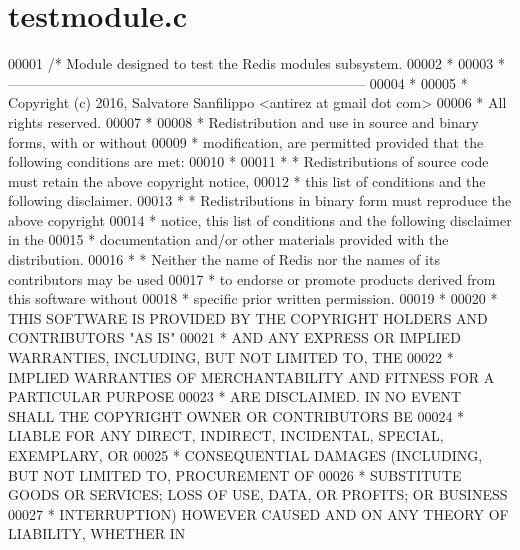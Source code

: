 \hypertarget{testmodule_8c_source}{}\section{testmodule.\+c}
\label{testmodule_8c_source}

\begin{DoxyCode}
00001 \textcolor{comment}{/* Module designed to test the Redis modules subsystem.}
00002 \textcolor{comment}{ *}
00003 \textcolor{comment}{ * -----------------------------------------------------------------------------}
00004 \textcolor{comment}{ *}
00005 \textcolor{comment}{ * Copyright (c) 2016, Salvatore Sanfilippo <antirez at gmail dot com>}
00006 \textcolor{comment}{ * All rights reserved.}
00007 \textcolor{comment}{ *}
00008 \textcolor{comment}{ * Redistribution and use in source and binary forms, with or without}
00009 \textcolor{comment}{ * modification, are permitted provided that the following conditions are met:}
00010 \textcolor{comment}{ *}
00011 \textcolor{comment}{ *   * Redistributions of source code must retain the above copyright notice,}
00012 \textcolor{comment}{ *     this list of conditions and the following disclaimer.}
00013 \textcolor{comment}{ *   * Redistributions in binary form must reproduce the above copyright}
00014 \textcolor{comment}{ *     notice, this list of conditions and the following disclaimer in the}
00015 \textcolor{comment}{ *     documentation and/or other materials provided with the distribution.}
00016 \textcolor{comment}{ *   * Neither the name of Redis nor the names of its contributors may be used}
00017 \textcolor{comment}{ *     to endorse or promote products derived from this software without}
00018 \textcolor{comment}{ *     specific prior written permission.}
00019 \textcolor{comment}{ *}
00020 \textcolor{comment}{ * THIS SOFTWARE IS PROVIDED BY THE COPYRIGHT HOLDERS AND CONTRIBUTORS "AS IS"}
00021 \textcolor{comment}{ * AND ANY EXPRESS OR IMPLIED WARRANTIES, INCLUDING, BUT NOT LIMITED TO, THE}
00022 \textcolor{comment}{ * IMPLIED WARRANTIES OF MERCHANTABILITY AND FITNESS FOR A PARTICULAR PURPOSE}
00023 \textcolor{comment}{ * ARE DISCLAIMED. IN NO EVENT SHALL THE COPYRIGHT OWNER OR CONTRIBUTORS BE}
00024 \textcolor{comment}{ * LIABLE FOR ANY DIRECT, INDIRECT, INCIDENTAL, SPECIAL, EXEMPLARY, OR}
00025 \textcolor{comment}{ * CONSEQUENTIAL DAMAGES (INCLUDING, BUT NOT LIMITED TO, PROCUREMENT OF}
00026 \textcolor{comment}{ * SUBSTITUTE GOODS OR SERVICES; LOSS OF USE, DATA, OR PROFITS; OR BUSINESS}
00027 \textcolor{comment}{ * INTERRUPTION) HOWEVER CAUSED AND ON ANY THEORY OF LIABILITY, WHETHER IN}

\end{DoxyCode}
